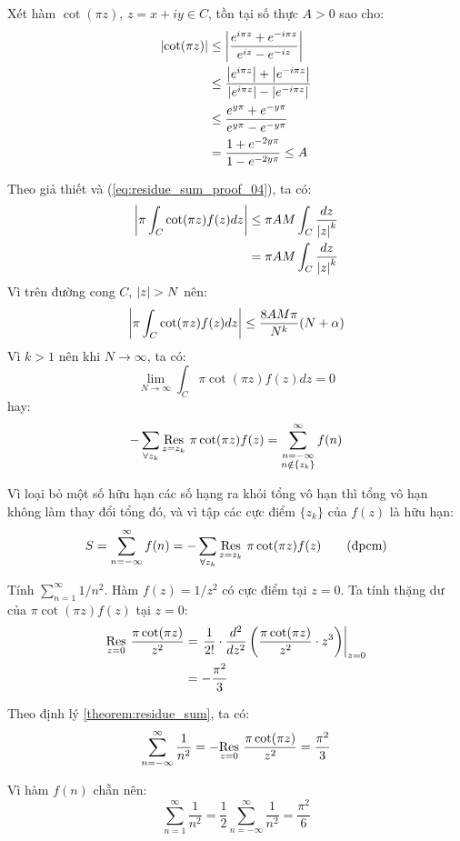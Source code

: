 Xét hàm $\cot(\pi z)$, $z = x + iy \in C$, tồn tại số thực $A>0$ sao cho:
\begin{align}
	\label{eq:residue_sum_proof_04}
	\abs{\cot(\pi z)}
	&\le \abs{\frac{e^{i\pi z} + e^{-i\pi z}}{e^{iz} - e^{-iz}}}\nonumber\\
	&\le \frac{\abs{e^{i\pi z}}+\abs{e^{-i\pi z}}}{\abs{e^{i\pi z}}-\abs{e^{-i\pi z}}}\nonumber\\
	&\le \frac{e^{y\pi} + e^{-y\pi}}{e^{y\pi}-e^{-y\pi}}\nonumber\\
	&= \frac{1+e^{-2y\pi}}{1-e^{-2y\pi}}\le A
\end{align}

Theo giả thiết và (\ref{eq:residue_sum_proof_04}), ta có:
\begin{align}
	\abs{\pi\int_C \cot(\pi z) f(z) dz}
	&\le \pi AM \int_C \frac{dz}{\abs{z}^k}\nonumber\\
	&= \pi AM \int_C \frac{dz}{\abs{z}^k}
\end{align}
Vì trên đường cong $C$, $\abs{z} > N$ nên:
\begin{equation}
	\abs{\pi\int_C \cot(\pi z) f(z) dz} \le \frac{8 AM\pi}{N^k}(N+\alpha)
\end{equation}
Vì $k > 1$ nên khi $N \to \infty$, ta có:
\begin{equation}
	\lim_{N\to \infty} \int_C \pi \cot(\pi z) f(z)dz  = 0
\end{equation}
hay:
\begin{equation}
	-\sum_{\forall z_k} \Res{\pi \cot(\pi z) f(z)}{z=z_k} = \sum_{\substack{n = -\infty\\n\notin \{z_k\}}}^{\infty} f(n)
\end{equation}

Vì loại bỏ một số hữu hạn các số hạng ra khỏi tổng vô hạn thì tổng vô hạn không làm thay đổi tổng đó, và vì tập các cực điểm $\{z_k\}$ của $f(z)$ là hữu hạn:
\begin{equation}
	S = \sum_{n=-\infty}^{\infty} f(n) = -\sum_{\forall z_k} \Res{\pi\cot(\pi z)f(z)}{z=z_k} \tag{đpcm}
\end{equation}

\begin{example}
	Tính $\sum_{n=1}^\infty 1/n^2$. Hàm $f(z) = 1/z^2$ có cực điểm tại $z=0$. Ta tính thặng dư của $\pi \cot(\pi z) f(z)$ tại $z=0$:
	\begin{align*}
		\Res{\frac{\pi \cot(\pi z)}{z^2}}{z=0} 
		&= \left.\frac{1}{2!}\cdot\frac{d^2}{dz^2}\left(\frac{\pi \cot(\pi z)}{z^2}\cdot z^3 \right) \right\rvert_{z=0}\\
		&= - \frac{ \pi^{2}}{3}
	\end{align*}
\end{example}

Theo định lý \ref{theorem:residue_sum}, ta có:
\begin{equation*}
	 \sum_{n=-\infty}^{\infty} \frac{1}{n^2}=-\Res{\frac{\pi \cot(\pi z)}{z^2}}{z=0}  = \frac{\pi^2}3
\end{equation*}

Vì hàm $f(n)$ chẵn nên:
\begin{equation*}
	\sum_{n=1}^\infty \frac 1 {n^2} = \frac{1}{2}\sum_{n=-\infty}^{\infty} \frac{1}{n^2} = \frac{\pi^2}{6}
\end{equation*}
